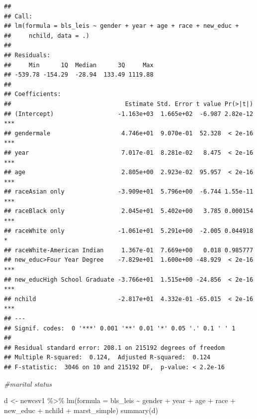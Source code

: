 \documentclass[
]{article}
\newenvironment{Shaded}{\begin{snugshade}}{\end{snugshade}}
\newcommand{\AttributeTok}[1]{\textcolor[rgb]{0.77,0.63,0.00}{#1}}
\newcommand{\CommentTok}[1]{\textcolor[rgb]{0.56,0.35,0.01}{\textit{#1}}}
\newcommand{\FunctionTok}[1]{\textcolor[rgb]{0.00,0.00,0.00}{#1}}
\newcommand{\NormalTok}[1]{#1}
\newcommand{\OtherTok}[1]{\textcolor[rgb]{0.56,0.35,0.01}{#1}}
\newcommand{\SpecialCharTok}[1]{\textcolor[rgb]{0.00,0.00,0.00}{#1}}
\begin{document}
\begin{verbatim}
## 
## Call:
## lm(formula = bls_leis ~ gender + year + age + race + new_educ + 
##     nchild, data = .)
## 
## Residuals:
##     Min      1Q  Median      3Q     Max 
## -539.78 -154.29  -28.94  133.49 1119.88 
## 
## Coefficients:
##                                Estimate Std. Error t value Pr(>|t|)    
## (Intercept)                  -1.163e+03  1.665e+02  -6.987 2.82e-12 ***
## gendermale                    4.746e+01  9.070e-01  52.328  < 2e-16 ***
## year                          7.017e-01  8.281e-02   8.475  < 2e-16 ***
## age                           2.805e+00  2.923e-02  95.957  < 2e-16 ***
## raceAsian only               -3.909e+01  5.796e+00  -6.744 1.55e-11 ***
## raceBlack only                2.045e+01  5.402e+00   3.785 0.000154 ***
## raceWhite only               -1.061e+01  5.291e+00  -2.005 0.044918 *  
## raceWhite-American Indian     1.367e-01  7.669e+00   0.018 0.985777    
## new_educ>Four Year Degree    -7.829e+01  1.600e+00 -48.929  < 2e-16 ***
## new_educHigh School Graduate -3.766e+01  1.515e+00 -24.856  < 2e-16 ***
## nchild                       -2.817e+01  4.332e-01 -65.015  < 2e-16 ***
## ---
## Signif. codes:  0 '***' 0.001 '**' 0.01 '*' 0.05 '.' 0.1 ' ' 1
## 
## Residual standard error: 208.1 on 215192 degrees of freedom
## Multiple R-squared:  0.124,  Adjusted R-squared:  0.124 
## F-statistic:  3046 on 10 and 215192 DF,  p-value: < 2.2e-16
\end{verbatim}

\begin{Shaded}
\begin{Highlighting}[]
\CommentTok{\#marital status}

\NormalTok{d }\OtherTok{\textless{}{-}}\NormalTok{ newcsv1 }\SpecialCharTok{\%\textgreater{}\%}
  \FunctionTok{lm}\NormalTok{(}\AttributeTok{formula =}\NormalTok{ bls\_leis }\SpecialCharTok{\textasciitilde{}}\NormalTok{ gender }\SpecialCharTok{+}\NormalTok{ year }\SpecialCharTok{+}\NormalTok{ age }\SpecialCharTok{+}\NormalTok{ race }\SpecialCharTok{+}\NormalTok{ new\_educ }\SpecialCharTok{+}\NormalTok{ nchild }\SpecialCharTok{+}\NormalTok{ marst\_simple) }
\FunctionTok{summary}\NormalTok{(d)}
\end{Highlighting}
\end{Shaded}
\end{document}
